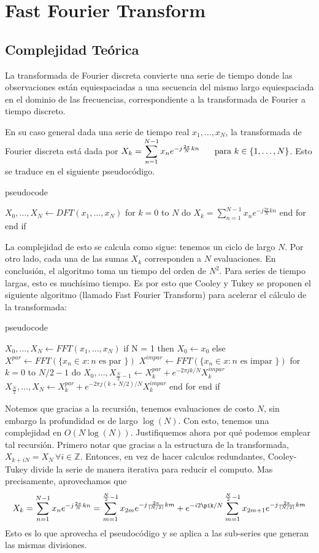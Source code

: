 \documentclass[letterpaper,11pt,oneside]{article}
\theoremstyle{break}
\begin{document}
\newpage
\section{Fast Fourier Transform}
\subsection{Complejidad Teórica}
La transformada de Fourier discreta convierte una serie de tiempo donde las observaciones están equiespaciadas a una secuencia del mismo largo equiespaciada en el dominio de las frecuencias, correspondiente a la transformada de Fourier a tiempo discreto. 

En su caso general dada una serie de tiempo real $x_1,\dots,x_N$, la transformada de Fourier discreta está dada por $ X_k = \displaystyle \sum^{N-1}_{n=1}x_n e^{-j \frac{2\pi}{N} kn} \hspace{.5cm}\text{ para }k\in\{1,\dots,N\} $.
Esto se traduce en el siguiente pseudocódigo.
\begin{sourcecodep}{pseudocode}{}

$X_0,\dots,X_N \leftarrow DFT(x_1,\dots,x_N)$
    for $k = 0$ to $N$ do
        $X_k =\displaystyle \sum^{N-1}_{n=1}x_n e^{-j \frac{2\pi}{N} kn}$
    end for
end if
\end{sourcecodep}

La complejidad de esto se calcula como sigue: tenemos un ciclo de largo $N$. Por otro lado, cada una de las sumas $X_k$ corresponden a $N$ evaluaciones. En conclusión, el algoritmo toma un tiempo del orden de $N^2$. Para series de tiempo largas, esto es muchísimo tiempo. Es por esto que Cooley y Tukey se proponen el siguiente algoritmo (llamado Fast Fourier Transform) para acelerar el cálculo de la transformada:
\begin{sourcecodep}{pseudocode}{}

$X_0,\dots,X_N \leftarrow FFT(x_1,\dots,x_N)$
    if N = 1 then
        $X_0 \leftarrow x_0$
    else
        $X^{par} \leftarrow FFT(\{x_n\in x:n \text{ es par }\})$
        $X^{impar} \leftarrow FFT(\{x_n\in x:n \text{ es impar }\})$
        for $k = 0$ to $N/2−1$ do
            $X_0,\dots,X_{\frac{N}{2}−1} \leftarrow X^{par}_k+e^{-2\pi j k/N}X^{impar}_k$
            $X_{\frac{N}{2}},\dots,X_N \leftarrow X^{par}_k+e^{-2\pi j (k+N/2)/N}X^{impar}_k$
        end for
    end if
\end{sourcecodep}
Notemos que gracias a la recursión, tenemos evaluaciones de costo $N$, sin embargo la profundidad es de largo $\log(N)$. Con esto, tenemos una complejidad en $O(N\log(N))$. Justifiquemos ahora por qué podemos emplear tal recursión. Primero notar que gracias a la estructura de la transformada, $X_{k+iN}=X_N\,\forall i\in\mathbb{Z}$. Entonces, en vez de hacer calculos redundantes, Cooley-Tukey divide la serie de manera iterativa para reducir el computo. Mas precisamente, aprovechamos que
$$ X_k = \displaystyle \sum^{N-1}_{n=1}x_n e^{-j \frac{2\pi}{N} kn} = \sum^{\frac{N}{2}-1}_{m=1}x_{2m} e^{-j \frac{2\pi}{(N/2)} km}+e^{-i2\pik/N}\sum^{\frac{N}{2}-1}_{m=1}x_{2m+1} e^{-j \frac{2\pi}{(N/2)} km}$$
Esto es lo que aprovecha el pseudocódigo y se aplica a las sub-series que generan las mismas divisiones.
\end{document}
